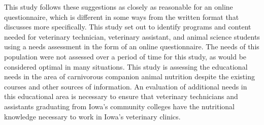 \par This study follows these suggestions as closely as reasonable for an online questionnaire, which is different in some ways from the written format that \cite{queeney} discusses more specifically. This study set out to identify programs and content needed for veterinary technician, veterinary assistant, and animal science students using a needs assessment in the form of an online questionnaire. The needs of this population were not assessed over a period of time for this study, as would be considered optimal in many situations\citep{queeney}. This study is assessing the educational needs in the area of carnivorous companion animal nutrition despite the existing courses and other sources of information. An evaluation of additional needs in this educational area is necessary to ensure that veterinary technicians and assistants graduating from Iowa's community colleges have the nutritional knowledge necessary to work in Iowa's veterinary clinics.
